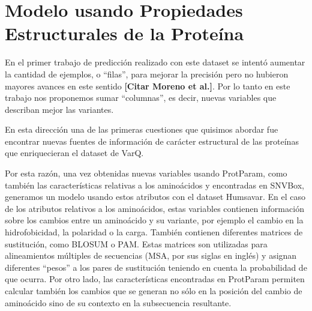 \section{Modelo usando Propiedades Estructurales de la Proteína}

En el primer trabajo de predicción realizado con este dataset se intentó aumentar la cantidad de ejemplos, o ``filas'', para mejorar la precisión pero no hubieron mayores avances en este sentido \textbf{[Citar Moreno et al.]}. Por lo tanto en este trabajo nos proponemos sumar ``columnas'', es decir, nuevas variables que describan mejor las variantes.

En esta dirección una de las primeras cuestiones que quisimos abordar fue encontrar nuevas fuentes de información de carácter estructural de las proteínas que enriquecieran el dataset de VarQ. 

Por esta razón, una vez obtenidas nuevas variables usando ProtParam, como también las características relativas a los aminoácidos y  encontradas en SNVBox, generamos un modelo usando estos atributos con el dataset Humsavar. En el caso de los atributos relativos a los aminoácidos, estas variables contienen información sobre los cambios entre un aminoácido y su variante, por ejemplo el cambio en la hidrofobicidad, la polaridad o la carga. También contienen diferentes matrices de sustitución, como BLOSUM o PAM. Estas matrices son utilizadas para alineamientos múltiples de secuencias (MSA, por sus siglas en inglés) y asignan diferentes ``pesos'' a los pares de sustitución teniendo en cuenta la probabilidad de que ocurra. Por otro lado, las características encontradas en ProtParam permiten calcular también los cambios que se generan no sólo en la posición del cambio de aminoácido sino de su contexto en la subsecuencia resultante. 



